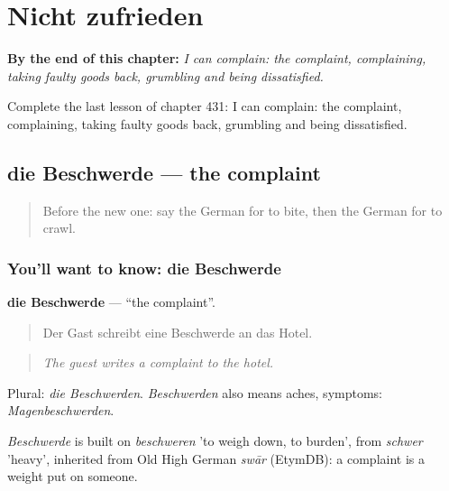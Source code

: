 
\chapter{Nicht zufrieden}
\label{ch:ge-nicht-zufrieden}

\begin{chapteropening}
\textbf{By the end of this chapter:} \emph{I can complain: the complaint, complaining, taking faulty goods back, grumbling and being dissatisfied.}

Complete the last lesson of chapter 431: I can complain: the complaint, complaining, taking faulty goods back, grumbling and being dissatisfied.
\end{chapteropening}

\section[die Beschwerde]{die Beschwerde — the complaint}

\label{lesson:GE-C431-beschwerde}



\begin{quote}
Before the new one: say the German for to bite, then the German for to crawl.
\end{quote}

\subsection*{You'll want to know: die Beschwerde}
\textbf{die Beschwerde} — \textquotedblleft{}the complaint\textquotedblright{}.

\begin{quote}
Der Gast schreibt eine Beschwerde an das Hotel.
\end{quote}

\begin{quote}
\emph{The guest writes a complaint to the hotel.}
\end{quote}

Plural: \emph{die Beschwerden}. \emph{Beschwerden} also means aches, symptoms: \emph{Magenbeschwerden}.

\begin{cousinweb}
\emph{Beschwerde} is built on \emph{beschweren} 'to weigh down, to burden', from \emph{schwer} 'heavy', inherited from Old High German \emph{swār} (EtymDB): a complaint is a weight put on someone.
\end{cousinweb}

